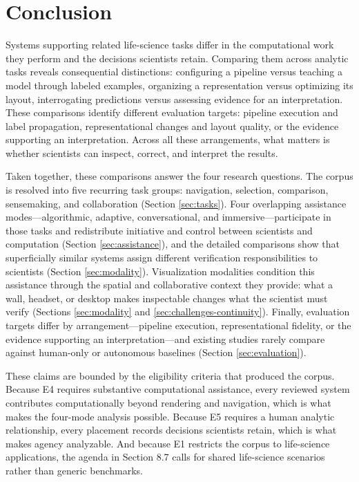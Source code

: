 \section{Conclusion}
\label{sec:conclusion}

Systems supporting related life-science tasks differ in the computational work they perform and the decisions scientists retain. Comparing them across analytic tasks reveals consequential distinctions: configuring a pipeline versus teaching a model through labeled examples, organizing a representation versus optimizing its layout, interrogating predictions versus assessing evidence for an interpretation. These comparisons identify different evaluation targets: pipeline execution and label propagation, representational changes and layout quality, or the evidence supporting an interpretation. Across all these arrangements, what matters is whether scientists can inspect, correct, and interpret the results.

Taken together, these comparisons answer the four research questions. The corpus is resolved into five recurring task groups: navigation, selection, comparison, sensemaking, and collaboration (Section \ref{sec:tasks}). Four overlapping assistance modes---algorithmic, adaptive, conversational, and immersive---participate in those tasks and redistribute initiative and control between scientists and computation (Section \ref{sec:assistance}), and the detailed comparisons show that superficially similar systems assign different verification responsibilities to scientists (Section \ref{sec:modality}). Visualization modalities condition this assistance through the spatial and collaborative context they provide: what a wall, headset, or desktop makes inspectable changes what the scientist must verify (Sections \ref{sec:modality} and \ref{sec:challenges-continuity}). Finally, evaluation targets differ by arrangement---pipeline execution, representational fidelity, or the evidence supporting an interpretation---and existing studies rarely compare against human-only or autonomous baselines (Section \ref{sec:evaluation}).

These claims are bounded by the eligibility criteria that produced the corpus. Because E4 requires substantive computational assistance, every reviewed system contributes computationally beyond rendering and navigation, which is what makes the four-mode analysis possible. Because E5 requires a human analytic relationship, every placement records decisions scientists retain, which is what makes agency analyzable. And because E1 restricts the corpus to life-science applications, the agenda in Section 8.7 calls for shared life-science scenarios rather than generic benchmarks.

